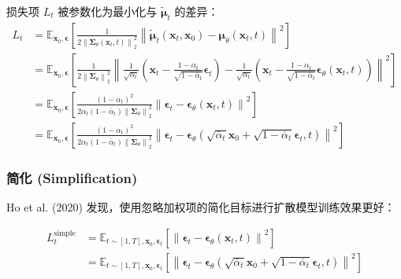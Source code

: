\documentclass[zihao=-4, fontset=windows]{ctexart}
\begin{document}
损失项 $L_t$ 被参数化为最小化与 $\tilde{\boldsymbol{\mu}}_t$ 的差异：
\begin{equation}
\begin{aligned}
L_{t} & =\mathbb{E}_{\mathbf{x}_{0}, \boldsymbol{\epsilon}}\left[\frac{1}{2\left\| \boldsymbol{\Sigma}_{\theta}(\mathbf{x}_{t}, t)\right\| _{2}^{2}}\left\| \tilde{\boldsymbol{\mu}}_{t}(\mathbf{x}_{t}, \mathbf{x}_{0})-\boldsymbol{\mu}_{\theta}(\mathbf{x}_{t}, t)\right\| ^{2}\right] \\
& =\mathbb{E}_{\mathbf{x}_{0}, \boldsymbol{\epsilon}}\left[\frac{1}{2\left\| \boldsymbol{\Sigma}_{\theta}\right\| _{2}^{2}}\left\| \frac{1}{\sqrt{\alpha_{t}}}\left(\mathbf{x}_{t}-\frac{1-\alpha_{t}}{\sqrt{1-\bar{\alpha}_{t}}} \boldsymbol{\epsilon}_{t}\right)-\frac{1}{\sqrt{\alpha_{t}}}\left(\mathbf{x}_{t}-\frac{1-\alpha_{t}}{\sqrt{1-\bar{\alpha}_{t}}} \boldsymbol{\epsilon}_{\theta}(\mathbf{x}_{t}, t)\right)\right\| ^{2}\right] \\
& =\mathbb{E}_{\mathbf{x}_{0}, \boldsymbol{\epsilon}}\left[\frac{(1-\alpha_{t})^{2}}{2 \alpha_{t}(1-\bar{\alpha}_{t})\left\| \boldsymbol{\Sigma}_{\theta}\right\| _{2}^{2}}\left\| \boldsymbol{\epsilon}_{t}-\boldsymbol{\epsilon}_{\theta}(\mathbf{x}_{t}, t)\right\| ^{2}\right] \\
& =\mathbb{E}_{\mathbf{x}_{0}, \boldsymbol{\epsilon}}\left[\frac{(1-\alpha_{t})^{2}}{2 \alpha_{t}(1-\bar{\alpha}_{t})\left\| \boldsymbol{\Sigma}_{\theta}\right\| _{2}^{2}}\left\| \boldsymbol{\epsilon}_{t}-\boldsymbol{\epsilon}_{\theta}(\sqrt{\bar{\alpha}_{t}} \mathbf{x}_{0}+\sqrt{1-\bar{\alpha}_{t}} \boldsymbol{\epsilon}_{t}, t)\right\| ^{2}\right]
\end{aligned}
\end{equation}

\subsubsection{简化 (Simplification)}

Ho et al. (2020) 发现，使用忽略加权项的简化目标进行扩散模型训练效果更好：

\begin{equation}
\begin{aligned}
L_{t}^{\text{simple}} & =\mathbb{E}_{t \sim[1, T], \mathbf{x}_{0}, \boldsymbol{\epsilon}_{t}}\left[\left\| \boldsymbol{\epsilon}_{t}-\boldsymbol{\epsilon}_{\theta}(\mathbf{x}_{t}, t)\right\| ^{2}\right] \\
& =\mathbb{E}_{t \sim[1, T], \mathbf{x}_{0}, \boldsymbol{\epsilon}_{t}}\left[\left\| \boldsymbol{\epsilon}_{t}-\boldsymbol{\epsilon}_{\theta}(\sqrt{\bar{\alpha}_{t}} \mathbf{x}_{0}+\sqrt{1-\bar{\alpha}_{t}} \boldsymbol{\epsilon}_{t}, t)\right\| ^{2}\right]
\end{aligned}
\end{equation}
\end{document}
